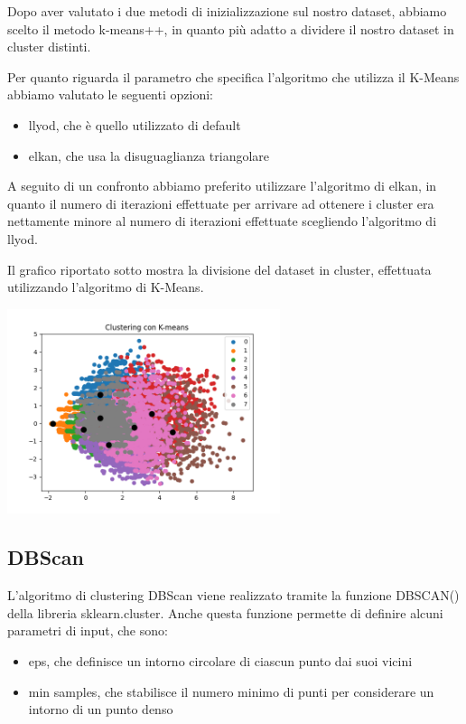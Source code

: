 \documentclass[a4paper, 10pt]{report}
\begin{document}
                Dopo aver valutato i due metodi di inizializzazione sul nostro dataset, abbiamo scelto il metodo k-means++, in quanto più adatto
                a dividere il nostro dataset in cluster distinti.

                Per quanto riguarda il parametro che specifica l'algoritmo che utilizza il K-Means abbiamo valutato le seguenti opzioni:
                \begin{itemize}
                    \item llyod, che è quello utilizzato di default
                    \item elkan, che usa la disuguaglianza triangolare
                \end{itemize}

                A seguito di un confronto abbiamo preferito utilizzare l'algoritmo di elkan, in quanto il numero di iterazioni effettuate per arrivare ad ottenere
                i cluster era nettamente minore al numero di iterazioni effettuate scegliendo l'algoritmo di llyod.

                Il grafico riportato sotto mostra la divisione del dataset in cluster, effettuata utilizzando l'algoritmo di K-Means.

                \begin{center}
                    \includegraphics[width=8cm]{modelling/ClusterK-Means.png}\\
                \end{center}

            \subsection{DBScan}
                L'algoritmo di clustering DBScan viene realizzato tramite la funzione DBSCAN() della libreria sklearn.cluster.
                Anche questa funzione permette di definire alcuni parametri di input, che sono:
                \begin{itemize}
                    \item eps, che definisce un intorno circolare di ciascun punto dai suoi vicini
                    \item min samples, che stabilisce il numero minimo di punti per considerare un intorno di un punto denso
                \end{itemize}
\end{document}
